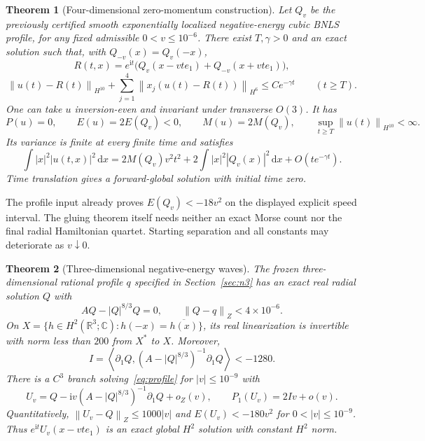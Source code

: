 \documentclass[11pt,a4paper]{article}
\newtheorem{theorem}{Theorem}[section]
\theoremstyle{remark}\newtheorem{remark}[theorem]{Remark}
\newcommand{\R}{\mathbb R}\newcommand{\C}{\mathbb C}
\newcommand{\ii}{\mathrm i}\newcommand{\dd}{\,\mathrm d}
\newcommand{\norm}[1]{\left\|#1\right\|}
\newcommand{\ip}[2]{\left\langle #1,#2\right\rangle}
\begin{document}
\begin{theorem}[Four-dimensional zero-momentum construction]\label{thm:pair}
Let $Q_v$ be the previously certified smooth exponentially localized negative-energy cubic BNLS profile, for any fixed admissible $0<v\le10^{-6}$. There exist $T,\gamma>0$ and an exact solution such that, with $Q_{-v}(x)=Q_v(-x)$,
\[
 R(t,x)=e^{\ii t}\bigl(Q_v(x-vte_1)+Q_{-v}(x+vte_1)\bigr),
\]
\begin{equation}\label{eq:weightedpair}
 \norm{u(t)-R(t)}_{H^{10}}+
 \sum_{j=1}^4\norm{x_j(u(t)-R(t))}_{H^6}\le Ce^{-\gamma t}
 \qquad(t\ge T).
\end{equation}
One can take $u$ inversion-even and invariant under transverse $O(3)$. It has
\[
 P(u)=0,\qquad E(u)=2E(Q_v)<0,\qquad M(u)=2M(Q_v),
 \qquad\sup_{t\ge T}\norm{u(t)}_{H^{10}}<\infty.
\]
Its variance is finite at every finite time and satisfies
\begin{equation}\label{eq:variance}
 \int|x|^2|u(t,x)|^2\dd x
 =2M(Q_v)v^2t^2+2\int|x|^2|Q_v(x)|^2\dd x+O(te^{-\gamma t}).
\end{equation}
Time translation gives a forward-global solution with initial time zero.
\end{theorem}

The profile input already proves $E(Q_v)<-18v^2$ on the displayed explicit speed interval. The gluing theorem itself needs neither an exact Morse count nor the final radial Hamiltonian quartet. Starting separation and all constants may deteriorate as $v\downarrow0$.

\begin{theorem}[Three-dimensional negative-energy waves]\label{thm:n3}
The frozen three-dimensional rational profile $q$ specified in Section~\ref{sec:n3} has an exact real radial solution $Q$ with
\[
 A Q-|Q|^{8/3}Q=0,\qquad\norm{Q-q}_Z<4\times10^{-6}.
\]
On $X=\{h\in H^2(\R^3;\C):h(-x)=\overline{h(x)}\}$, its real linearization is invertible with norm less than $200$ from $X^*$ to $X$. Moreover,
\begin{equation}\label{eq:n3I}
 I=\ip{\partial_1Q}{(A-|Q|^{8/3})^{-1}\partial_1Q}<-1280.
\end{equation}
There is a $C^3$ branch solving~\eqref{eq:profile} for $|v|\le10^{-9}$ with
\[
 U_v=Q-\ii v(A-|Q|^{8/3})^{-1}\partial_1Q+o_Z(v),
 \qquad P_1(U_v)=2Iv+o(v).
\]
Quantitatively, $\norm{U_v-Q}_Z\le1000|v|$ and $E(U_v)<-180v^2$ for $0<|v|\le10^{-9}$. Thus $e^{\ii t}U_v(x-vte_1)$ is an exact global $H^2$ solution with constant $H^2$ norm.
\end{theorem}
\end{document}

